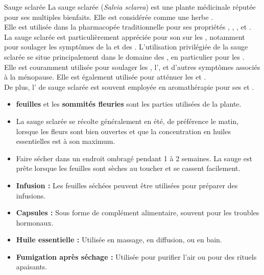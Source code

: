 \ficheidentiteplantelong
{Sauge sclarée}
{%
    La sauge sclarée (\textit{Salvia sclarea}) est une plante médicinale réputée pour ses multiples bienfaits. 
    Elle est considérée comme une herbe . \\

    Elle est utilisée dans la pharmacopée traditionnelle pour ses propriétés , , 
    , et . \\

    La sauge sclarée est particulièrement appréciée pour son  sur les ,
    notamment pour soulager les symptômes de la  et des .
}
{%
    L'utilisation privilégiée de la sauge sclarée se situe principalement dans le domaine des , 
    en particulier pour les . \\

    Elle est couramment utilisée pour soulager les , l', et d'autres symptômes associés 
    à la ménopause. Elle est également utilisée pour atténuer les  et .\\

    De plus, l' de sauge sclarée est souvent employée en aromathérapie pour ses  
    et .
}
{%
    \begin{itemize}[label = \bcplume]
        \item \textbf{feuilles} et les \textbf{sommités fleuries} sont les parties utilisées de la plante.
        \item La sauge sclarée se récolte généralement en été, de préférence le matin, lorsque les fleurs sont bien ouvertes et 
                que la concentration en huiles essentielles est à son maximum. 
        \item Faire sécher dans un endroit ombragé pendant 1 à 2 semaines. La sauge est prête lorsque les feuilles sont sèches au toucher 
                et se cassent facilement.
    \end{itemize}
}
{%
    \begin{itemize}
        \item \textbf{Infusion :} Les feuilles séchées peuvent être utilisées pour préparer des infusions.
        \item \textbf{Capsules :} Sous forme de complément alimentaire, souvent pour les troubles hormonaux.
        \item \textbf{Huile essentielle :} Utilisée en massage, en diffusion, ou en bain.
        \item \textbf{Fumigation après séchage :} Utilisée pour purifier l'air ou pour des rituels apaisants.
    \end{itemize}
}
